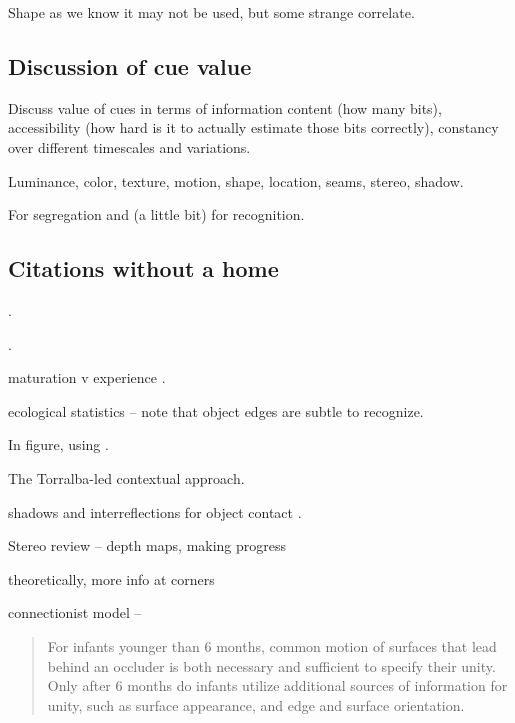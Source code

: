 Shape as we know it may not be used, but some strange 
correlate.



\subsection{Discussion of cue value}

Discuss value of cues in terms of information content (how many bits),
accessibility (how hard is it to actually estimate those bits
correctly), constancy over different timescales and variations.

Luminance, color, texture, motion, shape, location, seams, stereo,
shadow.

For segregation and (a little bit) for recognition.


\subsection{Citations without a home}

\cite{swain91color}.

\cite{schiele00recognition}.

\cite{lowe04distinctive}

\cite{felzenszwalb04efficient}

maturation v experience \cite{quinn05learning}.

ecological statistics \cite{martin04learning} -- note
that object edges are subtle to recognize.

In figure, using \cite{felzenszwalb04efficient}.

\cite{gibson88exploratory}

\cite{spelke90principles}

\cite{martin01database}

The Torralba-led contextual approach.


shadows and interreflections for object contact
\cite{madison01use}.


Stereo review -- depth maps, making progress
\cite{scharstein02taxonomy}

theoretically, more info at corners \cite{feldman05information}

connectionist model
\cite{mareschal02learning} --

\begin{quote}

For infants younger than 6 months, common motion of surfaces that lead
behind an occluder is both necessary and sufficient to specify their
unity. Only after 6 months do infants utilize additional sources of
information for unity, such as surface appearance, and edge and
surface orientation. \cite{mareschal02learning}

\end{quote}


